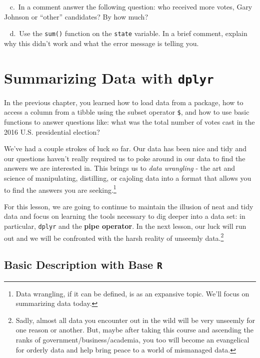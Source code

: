 \documentclass[
]{book}
\begin{document}
~ c.~In a comment answer the following question: who received more votes, Gary Johnson or ``other'' candidates? By how much?

~ d.~Use the \texttt{sum()} function on the \texttt{state} variable. In a brief comment, explain why this didn't work and what the error message is telling you.

\hypertarget{summarizing-data-with-dplyr}{%
\chapter{\texorpdfstring{Summarizing Data with \texttt{dplyr}}{Summarizing Data with dplyr}}\label{summarizing-data-with-dplyr}}

In the previous chapter, you learned how to load data from a package, how to access a column from a tibble using the subset operator \texttt{\$}, and how to use basic functions to answer questions like: what was the total number of votes cast in the 2016 U.S. presidential election?

We've had a couple strokes of luck so far. Our data has been nice and tidy and our questions haven't really required us to poke around in our data to find the answers we are interested in. This brings us to \emph{data wrangling} - the art and science of manipulating, distilling, or cajoling data into a format that allows you to find the answers you are seeking.\footnote{Data wrangling, if it can be defined, is as an expansive topic. We'll focus on summarizing data today.}

For this lesson, we are going to continue to maintain the illusion of neat and tidy data and focus on learning the tools necessary to dig deeper into a data set: in particular, \texttt{dplyr} and the \textbf{pipe operator}. In the next lesson, our luck will run out and we will be confronted with the harsh reality of unseemly data.\footnote{Sadly, almost all data you encounter out in the wild will be very unseemly for one reason or another. But, maybe after taking this course and ascending the ranks of government/business/academia, you too will become an evangelical for orderly data and help bring peace to a world of mismanaged data.}

\hypertarget{basic-description-with-base-r}{%
\section{\texorpdfstring{Basic Description with Base \texttt{R}}{Basic Description with Base R}}\label{basic-description-with-base-r}}
\end{document}
